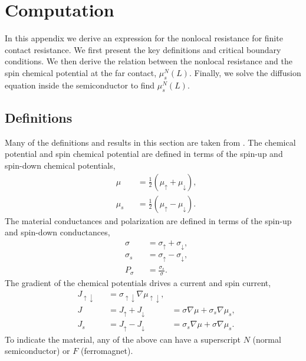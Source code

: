\appendix
\section{Computation}
\label{s:appendix}

In this appendix we derive an expression for
the nonlocal resistance for finite contact resistance.
We first present the key definitions and critical boundary conditions.
We then derive the relation between the nonlocal resistance
and the spin chemical potential at the far contact, $μ_s^N (L)$.
Finally, we solve the diffusion equation inside the semiconductor to find $μ_s^N (L)$.

\subsection{Definitions}

Many of the definitions and results in this section are taken from
\cite{ActaPhysicaSlovaca.57.4_5.565-907}.
The chemical potential and spin chemical potential are defined in terms
of the spin-up and spin-down chemical potentials,
\begin{subequations}
  \label{eq:potentials}
  \begin{alignat}{2}
    & μ   && = \frac{1}{2} \left( μ_↑ + μ_↓ \right) , \\
    & μ_s && = \frac{1}{2} \left( μ_↑ - μ_↓ \right) .
  \end{alignat}
\end{subequations}
The material conductances and polarization are defined in terms
of the spin-up and spin-down conductances,
\begin{subequations}
  \label{eq:conductances}
  \begin{alignat}{2}
    & σ   && = σ_↑ + σ_↓ , \\
    & σ_s && = σ_↑ - σ_↓ , \\
    \label{eq:material.polarization}
    & P_σ && = \frac{σ_s}{σ} .
  \end{alignat}
\end{subequations}
The gradient of the chemical potentials drives a current and spin current,
\begin{subequations}
  \label{eq:currents}
  \begin{alignat}{3}
    & J_{↑↓} && = σ_{↑↓} ∇μ_{↑↓} , \\
    \label{eq:currents.current}
    & J      && = J_↑ + J_↓      & = σ   ∇μ + σ_s ∇μ_s , \\
    \label{eq:currents.spincurrent}
    & J_s    && = J_↑ - J_↓      & = σ_s ∇μ + σ   ∇μ_s .
  \end{alignat}
\end{subequations}
To indicate the material, any of the above can have a superscript
$N$ (normal semiconductor) or $F$ (ferromagnet).

